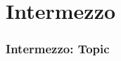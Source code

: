 \section{Intermezzo}
\label{sec:intermezzo}

\begin{frame}
	\frametitle{Intermezzo: Topic}
	
\end{frame}


